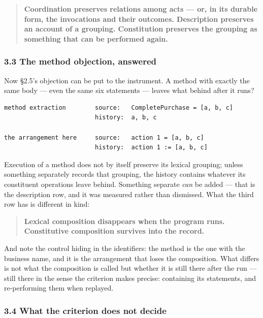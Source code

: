 \documentclass[
]{article}
\begin{document}
\begin{quote}
\textbf{Coordination preserves relations among acts --- or, in its
durable form, the invocations and their outcomes. Description preserves
an account of a grouping. Constitution preserves the grouping as
something that can be performed again.}
\end{quote}

\subsubsection{3.3 The method objection,
answered}\label{the-method-objection-answered}

Now §2.5's objection can be put to the instrument. A method with exactly
the same body --- even the same six statements --- leaves what behind
after it runs?

\begin{verbatim}
method extraction        source:   CompletePurchase = [a, b, c]
                         history:  a, b, c

the arrangement here     source:   action 1 = [a, b, c]
                         history:  action 1 := [a, b, c]
\end{verbatim}

Execution of a method does not by itself preserve its lexical grouping;
unless something separately records that grouping, the history contains
whatever its constituent operations leave behind. Something separate
\emph{can} be added --- that is the description row, and it was measured
rather than dismissed. What the third row has is different in kind:

\begin{quote}
\textbf{Lexical composition disappears when the program runs.
Constitutive composition survives into the record.}
\end{quote}

And note the control hiding in the identifiers: the method is the one
with the business name, and it is the arrangement that loses the
composition. What differs is not what the composition is called but
whether it is still there after the run --- still there in the sense the
criterion makes precise: containing its statements, and re-performing
them when replayed.

\subsubsection{3.4 What the criterion does not
decide}\label{what-the-criterion-does-not-decide}
\end{document}
